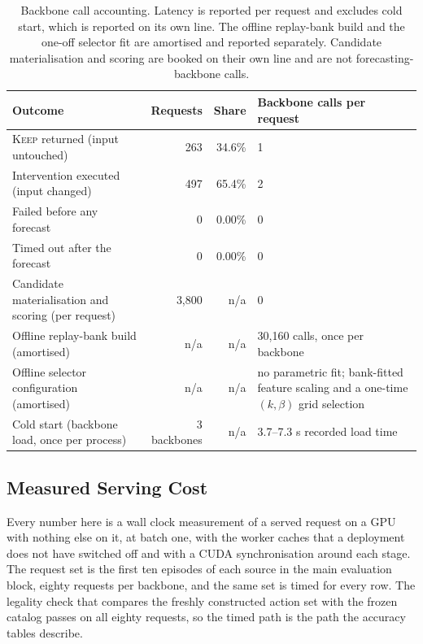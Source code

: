 \documentclass{article}
\begin{document}
\begin{table}[htbp]
  \caption{Backbone call accounting. Latency is reported per request and excludes cold start,
  which is reported on its own line. The offline replay-bank build and the one-off selector fit
  are amortised and reported separately. Candidate materialisation and scoring are booked on
  their own line and are not forecasting-backbone calls.}
  \label{tab:app-calls}
  \centering
  \small
  \setlength{\tabcolsep}{4pt}
\begin{tabularx}{\textwidth}{@{}XrrX@{}}
    \toprule
    Outcome & Requests & Share & Backbone calls per request \\
    \midrule
    \textsc{Keep} returned (input untouched)   & 263    & 34.6\%    & 1 \\
    Intervention executed (input changed)      & 497     & 65.4\%     & 2 \\
    Failed before any forecast                 & 0    & 0.00\%    & 0 \\
    Timed out after the forecast               & 0 & 0.00\% & 0 \\
    \midrule
    Candidate materialisation and scoring (per request) & 3,800 & n/a & 0 \\
    Offline replay-bank build (amortised)      & n/a & n/a & 30,160 calls, once per backbone \\
    Offline selector configuration (amortised)  & n/a & n/a & no parametric fit; bank-fitted feature scaling and a one-time $(k,\beta)$ grid selection \\
    Cold start (backbone load, once per process) & 3 backbones & n/a & 3.7--7.3 s recorded load time \\
    \bottomrule
  \end{tabularx}
\end{table}

\subsection{Measured Serving Cost}
\label{app:calls-measured}
Every number here is a wall clock measurement of a served request on a GPU with nothing else
on it, at batch one, with the worker caches that a deployment does not have switched off and
with a CUDA synchronisation around each stage. The request set is the first ten episodes of
each source in the main evaluation block, eighty requests per backbone, and the same set is
timed for every row. The legality check that compares the freshly constructed action set with
the frozen catalog passes on all eighty requests, so the timed path is the path the accuracy
tables describe.
\end{document}
